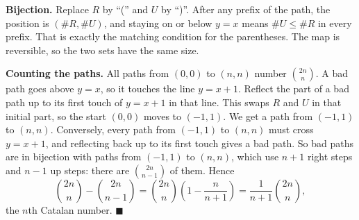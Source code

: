 \textbf{Bijection.} Replace $R$ by ``('' and $U$ by ``)''. After any prefix of the path, the position is $(\#R,\#U)$, and staying on or below $y=x$ means $\#U\le\#R$ in every prefix. That is exactly the matching condition for the parentheses. The map is reversible, so the two sets have the same size.

\textbf{Counting the paths.} All paths from $(0,0)$ to $(n,n)$ number $\binom{2n}n$. A bad path goes above $y=x$, so it touches the line $y=x+1$. Reflect the part of a bad path up to its first touch of $y=x+1$ in that line. This swaps $R$ and $U$ in that initial part, so the start $(0,0)$ moves to $(-1,1)$. We get a path from $(-1,1)$ to $(n,n)$. Conversely, every path from $(-1,1)$ to $(n,n)$ must cross $y=x+1$, and reflecting back up to its first touch gives a bad path. So bad paths are in bijection with paths from $(-1,1)$ to $(n,n)$, which use $n+1$ right steps and $n-1$ up steps: there are $\binom{2n}{n-1}$ of them. Hence
\[\binom{2n}n-\binom{2n}{n-1}=\binom{2n}n\left(1-\dfrac n{n+1}\right)=\boxed{\dfrac1{n+1}\binom{2n}n},\]
the $n$th Catalan number. $\blacksquare$
